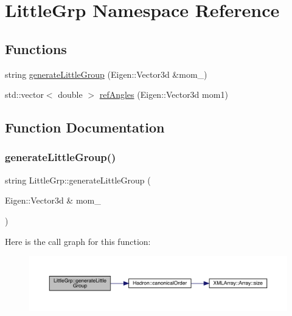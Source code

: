 \hypertarget{namespaceLittleGrp}{}\section{Little\+Grp Namespace Reference}
\label{namespaceLittleGrp}
\subsection*{Functions}
\begin{DoxyCompactItemize}
\item 
string \mbox{\hyperlink{namespaceLittleGrp_a12887808e1a825e9d2c387c5475bcf88}{generate\+Little\+Group}} (Eigen\+::\+Vector3d \&mom\+\_\+)
\item 
std\+::vector$<$ double $>$ \mbox{\hyperlink{namespaceLittleGrp_a93937e135b6b9c963ae9ad26516e252d}{ref\+Angles}} (Eigen\+::\+Vector3d mom1)
\end{DoxyCompactItemize}


\subsection{Function Documentation}
\mbox{\label{namespaceLittleGrp_a12887808e1a825e9d2c387c5475bcf88}} 
\subsubsection{\texorpdfstring{generateLittleGroup()}{generateLittleGroup()}}
{\footnotesize\ttfamily string Little\+Grp\+::generate\+Little\+Group (\begin{DoxyParamCaption}\item[{Eigen\+::\+Vector3d \&}]{mom\+\_\+ }\end{DoxyParamCaption})}

Here is the call graph for this function\+:\nopagebreak
\begin{figure}[H]
\begin{center}
\leavevmode
\includegraphics[width=350pt]{d1/d4c/namespaceLittleGrp_a12887808e1a825e9d2c387c5475bcf88_cgraph}
\end{center}
\end{figure}
\mbox{\label{namespaceLittleGrp_a93937e135b6b9c963ae9ad26516e252d}} 
